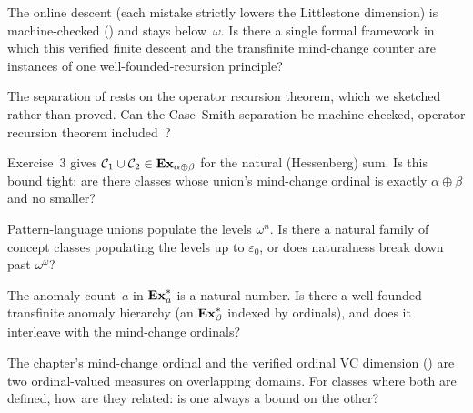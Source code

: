 \begin{openprob}
\label{op:online-transfinite}
The online descent (each mistake strictly lowers the Littlestone
dimension) is machine-checked ()
and stays below~$\omega$.  Is there a single formal framework in which this
verified finite descent and the transfinite mind-change counter are
instances of one well-founded-recursion principle?
\end{openprob}

\begin{openprob}
\label{op:formalize-bc}
The separation of  rests on the operator recursion
theorem, which we sketched rather than proved.  Can the Case--Smith
separation be machine-checked, operator recursion theorem
included~\cite{CaseSmith1983}?
\end{openprob}

\begin{openprob}
\label{op:hessenberg-tight}
Exercise~3 gives $\mathcal{C}_1 \cup \mathcal{C}_2 \in
\mathbf{Ex}_{\alpha \oplus \beta}$ for the natural (Hessenberg) sum.  Is this bound
tight: are there classes whose union's mind-change ordinal is exactly
$\alpha \oplus \beta$ and no smaller?
\end{openprob}

\begin{openprob}
\label{op:natural-witnesses}
Pattern-language unions populate the levels $\omega^n$.  Is there a natural
family of concept classes populating the levels up to $\varepsilon_0$, or
does naturalness break down past $\omega^\omega$?~\cite{AmbainisJainSharma1999}
\end{openprob}

\begin{openprob}
\label{op:ordinal-anomaly}
The anomaly count~$a$ in $\mathbf{Ex}_a^*$ is a natural number.  Is there a
well-founded transfinite anomaly hierarchy (an $\mathbf{Ex}_\beta^*$ indexed by
ordinals), and does it interleave with the mind-change ordinals?
\end{openprob}

\begin{openprob}
\label{op:mco-vs-ordinalvc}
The chapter's mind-change ordinal and the verified ordinal VC dimension
() are two ordinal-valued measures on
overlapping domains.  For classes where both are defined, how are they
related: is one always a bound on the other?~\cite{MartinSharmaStephan2006}
\end{openprob}


